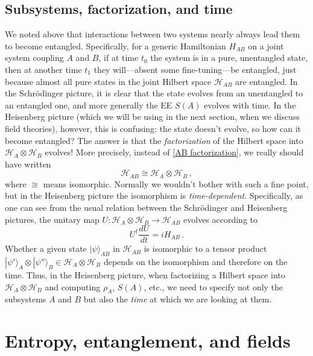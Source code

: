 \documentclass[11pt]{article}
\newcommand{\ket}[1]{|{#1}\rangle}
\newcommand{\HH}{\mathcal{H}}
\begin{document}
\subsection{Subsystems, factorization, and time}
\label{sec:factorization and time}

We noted above that interactions between two systems nearly always lead them to become entangled. Specifically, for a generic Hamiltonian $H_{AB}$ on a joint system coupling $A$ and $B$, if at time $t_0$ the system is in a pure, unentangled state, then at another time $t_1$ they will---absent some fine-tuning---be entangled, just because almost all pure states in the joint Hilbert space $\HH_{AB}$ are entangled. In the Schr\"odinger picture, it is clear that the state evolves from an unentangled to an entangled one, and more generally the EE $S(A)$ evolves with time. In the Heisenberg picture (which we will be using in the next section, when we discuss field theories), however, this is confusing: the state doesn't evolve, so how can it become entangled? The answer is that the \emph{factorization} of the Hilbert space into $\HH_A\otimes\HH_B$ evolves! More precisely, instead of \eqref{AB factorization}, we really should have written
\begin{equation}
\HH_{AB}\cong\HH_A\otimes\HH_B\,,
\end{equation}
where $\cong$ means isomorphic. Normally we wouldn't bother with such a fine point, but in the Heisenberg picture the isomorphism is \emph{time-dependent}. Specifically, as one can see from the usual relation between the Schr\"odinger and Heisenberg pictures, the unitary map $U:\HH_A\otimes\HH_B\to\HH_{AB}$ evolves according to
\begin{equation}
U^\dag\frac{dU}{dt} = iH_{AB}\,.
\end{equation}
Whether a given state $\ket{\psi}_{AB}$ in $\HH_{AB}$ is isomorphic to a tensor product $\ket{\psi'}_A\otimes\ket{\psi''}_B\in\HH_A\otimes\HH_B$ depends on the isomorphism and therefore on the time. Thus, in the Heisenberg picture, when factorizing a Hilbert space into $\HH_A\otimes\HH_B$ and computing $\rho_A$, $S(A)$, etc., we need to specify not only the subsystems $A$ and $B$ but also the \emph{time} at which we are looking at them.



\section{Entropy, entanglement, and fields}
\label{sec:EEfields}
\end{document}
